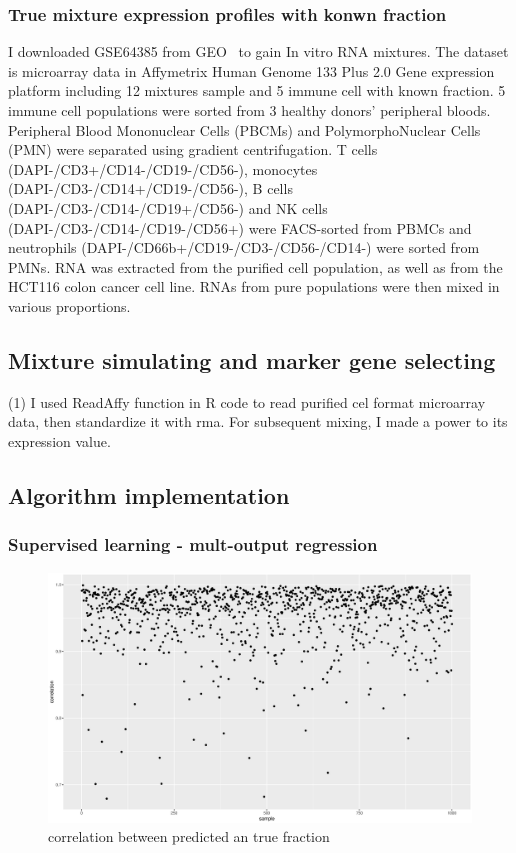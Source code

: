\documentclass{article}
\begin{document}
\subsubsection{True mixture expression profiles with konwn fraction}
I downloaded GSE64385 from GEO~\cite{Etienne2016Estimating} to gain In vitro RNA mixtures. The dataset is microarray data in Affymetrix Human Genome 133 Plus 2.0 Gene expression platform including 12 mixtures sample and 5 immune cell with known fraction. 5 immune cell populations were sorted from 3 healthy donors' peripheral bloods. Peripheral Blood Mononuclear Cells (PBCMs) and PolymorphoNuclear Cells (PMN) were separated using gradient centrifugation. T cells (DAPI-/CD3+/CD14-/CD19-/CD56-), monocytes (DAPI-/CD3-/CD14+/CD19-/CD56-), B cells (DAPI-/CD3-/CD14-/CD19+/CD56-) and NK cells (DAPI-/CD3-/CD14-/CD19-/CD56+) were FACS-sorted from PBMCs and neutrophils (DAPI-/CD66b+/CD19-/CD3-/CD56-/CD14-) were sorted from PMNs. RNA was extracted from the purified cell population, as well as from the HCT116 colon cancer cell line. RNAs from pure populations were then mixed in various proportions.

\subsection{Mixture simulating and marker gene selecting}
(1) I used ReadAffy function in R code to read purified cel format microarray data, then standardize it with rma. For subsequent mixing, I made a power to its expression value. 

\subsection{Algorithm implementation}
\subsubsection{Supervised learning - mult-output regression}
\begin{figure}[H]
     \centering
     \includegraphics[width=5in]{pic/morden_corr1000.eps}
     \caption{correlation between predicted an true fraction}
     \label{fig:f2}
\end{figure}
\end{document}
